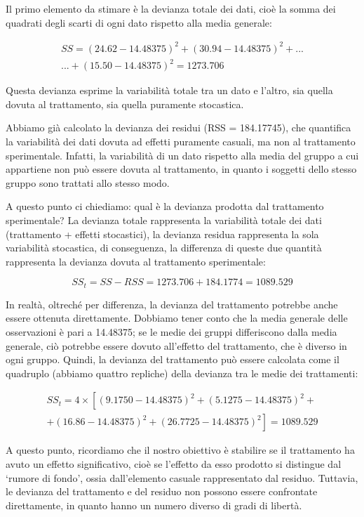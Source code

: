 \documentclass[a4paper,12pt,oneside]{book}
\begin{document}
Il primo elemento da stimare è la devianza totale dei dati, cioè la somma dei quadrati degli scarti di ogni dato rispetto alla media generale:

\[\begin{array}{c}
SS = \left(24.62 - 14.48375\right)^2 + \left(30.94 - 14.48375\right)^2 + ... \\
... + \left(15.50 - 14.48375\right)^2 = 1273.706
\end{array}\]

Questa devianza esprime la variabilità totale tra un dato e l'altro, sia quella dovuta al trattamento, sia quella puramente stocastica.

Abbiamo già calcolato la devianza dei residui (RSS = 184.17745), che quantifica la variabilità dei dati dovuta ad effetti puramente casuali, ma non al trattamento sperimentale. Infatti, la variabilità di un dato rispetto alla media del gruppo a cui appartiene non può essere dovuta al trattamento, in quanto i soggetti dello stesso gruppo sono trattati allo stesso modo.

A questo punto ci chiediamo: qual è la devianza prodotta dal trattamento sperimentale? La devianza totale rappresenta la variabilità totale dei dati (trattamento + effetti stocastici), la devianza residua rappresenta la sola variabilità stocastica, di conseguenza, la differenza di queste due quantità rappresenta la devianza dovuta al trattamento sperimentale:

\[SS_t = SS - RSS = 1273.706 + 184.1774 = 1089.529\]

In realtà, oltreché per differenza, la devianza del trattamento potrebbe anche essere ottenuta direttamente. Dobbiamo tener conto che la media generale delle osservazioni è pari a 14.48375; se le medie dei gruppi differiscono dalla media generale, ciò potrebbe essere dovuto all'effetto del trattamento, che è diverso in ogni gruppo. Quindi, la devianza del trattamento può essere calcolata come il quadruplo (abbiamo quattro repliche) della devianza tra le medie dei trattamenti:

\[{\begin{array}{l}
SS_t = 4 \times \left[ \left(9.1750 - 14.48375\right)^2 
+ \left(5.1275 - 14.48375\right)^2 + \right. \\
+ \left. \left(16.86 - 14.48375\right)^2 + \left(26.7725 - 14.48375\right)^2 \right] = 1089.529
\end{array}} \]

A questo punto, ricordiamo che il nostro obiettivo è stabilire se il trattamento ha avuto un effetto significativo, cioè se l'effetto da esso prodotto si distingue dal `rumore di fondo', ossia dall'elemento casuale rappresentato dal residuo. Tuttavia, le devianza del trattamento e del residuo non possono essere confrontate direttamente, in quanto hanno un numero diverso di gradi di libertà.
\end{document}
